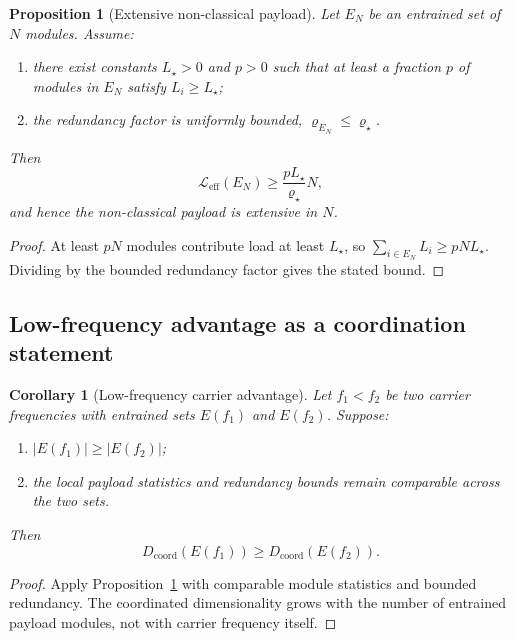\documentclass[11pt,a4paper]{article}
\newtheorem{proposition}[theorem]{Proposition}
\newtheorem{corollary}[theorem]{Corollary}
\theoremstyle{definition}
\theoremstyle{remark}
\begin{document}
\begin{proposition}[Extensive non-classical payload]
\label{prop:extensive}
Let $E_N$ be an entrained set of $N$ modules. Assume:
\begin{enumerate}[label=\emph{(\roman*)}]
\item there exist constants $L_\star>0$ and $p>0$ such that at least a fraction $p$ of modules in $E_N$ satisfy $L_i\ge L_\star$;
\item the redundancy factor is uniformly bounded, $\varrho_{E_N}\le \varrho_\star$.
\end{enumerate}
Then
\begin{equation}
\label{eq:extensive-bound}
\mathcal{L}_{\mathrm{eff}}(E_N)\ge \frac{pL_\star}{\varrho_\star}N,
\end{equation}
and hence the non-classical payload is extensive in $N$.
\end{proposition}

\begin{proof}
At least $pN$ modules contribute load at least $L_\star$, so $\sum_{i\in E_N}L_i\ge pNL_\star$. Dividing by the bounded redundancy factor gives the stated bound.
\end{proof}

\subsection{Low-frequency advantage as a coordination statement}

\begin{corollary}[Low-frequency carrier advantage]
\label{cor:lowf}
Let $f_1<f_2$ be two carrier frequencies with entrained sets $E(f_1)$ and $E(f_2)$. Suppose:
\begin{enumerate}[label=\emph{(\roman*)}]
\item $\lvert E(f_1)\rvert \ge \lvert E(f_2)\rvert$;
\item the local payload statistics and redundancy bounds remain comparable across the two sets.
\end{enumerate}
Then
\begin{equation}
\label{eq:lowf}
D_{\mathrm{coord}}(E(f_1))\ge D_{\mathrm{coord}}(E(f_2)).
\end{equation}
\end{corollary}

\begin{proof}
Apply Proposition~\ref{prop:extensive} with comparable module statistics and bounded redundancy. The coordinated dimensionality grows with the number of entrained payload modules, not with carrier frequency itself.
\end{proof}
\end{document}
